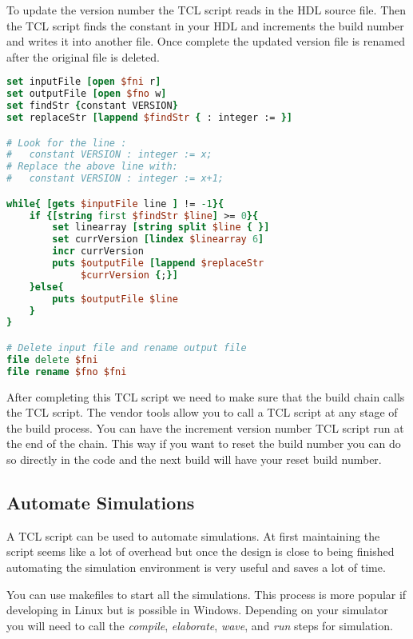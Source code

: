 To update the version number the \ac{TCL} script reads in the \ac{HDL} source file. Then the \ac{TCL} script finds the constant in your \ac{HDL} and increments the build number and writes it into another file. Once complete the updated version file is renamed after the original file is deleted. 

\begin{lstlisting}[language=tcl]
set inputFile [open $fni r]
set outputFile [open $fno w]
set findStr {constant VERSION}
set replaceStr [lappend $findStr { : integer := }]

# Look for the line :
#   constant VERSION : integer := x;
# Replace the above line with:
#   constant VERSION : integer := x+1;

while{ [gets $inputFile line ] != -1}{
    if {[string first $findStr $line] >= 0}{
        set linearray [string split $line { }]
        set currVersion [lindex $linearray 6]
        incr currVersion
        puts $outputFile [lappend $replaceStr 
             $currVersion {;}]
    }else{
        puts $outputFile $line
    }	
}

# Delete input file and rename output file
file delete $fni
file rename $fno $fni
\end{lstlisting}

After completing this \ac{TCL} script we need to make sure that the build chain calls the \ac{TCL} script. The vendor tools allow you to call a \ac{TCL} script at any stage of the build process. You can have the increment version number \ac{TCL} script run at the end of the chain. This way if you want to reset the build number you can do so directly in the code and the next build will have your reset build number. 
	
\subsection{Automate Simulations}

A \ac{TCL} script can be used to automate simulations. At first maintaining the script seems like a lot of overhead but once the design is close to being finished automating the simulation environment is very useful and saves a lot of time.
 
You can use makefiles to start all the simulations. This process is more popular if developing in Linux but is possible in Windows. Depending on your simulator you will need to call the \emph{compile}, \emph{elaborate}, \emph{wave}, and \emph{run} steps for simulation. 

